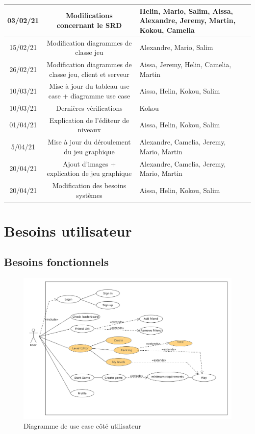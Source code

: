 \documentclass[a4paper,12pt]{article}
\begin{document}
\begin{tabularx}{16cm}{|c|c|X|}
	\hline
	    03/02/21 & Modifications concernant le SRD & Helin, Mario, Salim, Aissa,
		Alexandre, Jeremy, Martin, Kokou, Camelia\\
	\hline
	    15/02/21 & Modification diagrammes de classe jeu & Alexandre, Mario, Salim\\
	\hline
    	26/02/21 & Modification diagrammes de classe
	    jeu, client et serveur & Aissa, Jeremy, Helin, Camelia, Martin\\
	\hline
	    10/03/21 & Mise à jour du tableau use case + diagramme use case &  Aissa, Helin, Kokou, Salim\\
	\hline
	    10/03/21 & Dernières vérifications & Kokou\\
	\hline
	    01/04/21 & Explication de l'éditeur de niveaux & Aissa, Helin, Kokou, Salim\\
	\hline
	    5/04/21 & Mise à jour du déroulement du jeu graphique & Alexandre, Camelia, Jeremy, Mario, Martin\\
	\hline
	    20/04/21 & Ajout d'images + explication de jeu graphique & Alexandre, Camelia, Jeremy, Mario, Martin\\
	\hline
		 20/04/21 & Modification des besoins systèmes &  Aissa, Helin, Kokou, Salim\\
	\hline
\end{tabularx}

\newpage

\section{Besoins utilisateur}

\subsection{Besoins fonctionnels}


\begin{figure}[h!]
\centering
\includegraphics[width=15cm]{images/UserUseCase.png}
\caption{Diagramme de use case côté utilisateur}
\label{fig:UserUseCase}
\end{figure}
\end{document}
